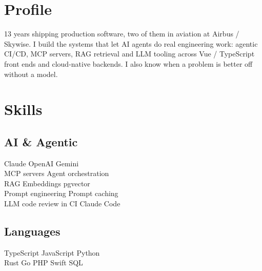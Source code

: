 \documentclass[]{pb-resume-openfonts}
\begin{document}
%
%
\lastupdated

%
%

%
%

\begin{minipage}[t]{0.33\textwidth}


\section{Profile}
\raggedright 13 years shipping production software, two of them in aviation at Airbus / Skywise. I build the systems that let AI agents do real engineering work: agentic CI/CD, MCP servers, RAG retrieval and LLM tooling across Vue / TypeScript front ends and cloud-native backends. I also know when a problem is better off without a model.
\sectionsep


\section{Skills}

\subsection{AI \& Agentic}
Claude \textbullet{} OpenAI \textbullet{} Gemini \\
MCP servers \textbullet{} Agent orchestration \\
RAG \textbullet{} Embeddings \textbullet{} pgvector \\
Prompt engineering \textbullet{} Prompt caching \\
LLM code review in CI \textbullet{} Claude Code
\sectionsep

\subsection{Languages}
TypeScript \textbullet{} JavaScript \textbullet{} Python \\
Rust \textbullet{} Go \textbullet{} PHP \textbullet{} Swift \textbullet{} SQL
\sectionsep


\end{minipage}
\end{document}
